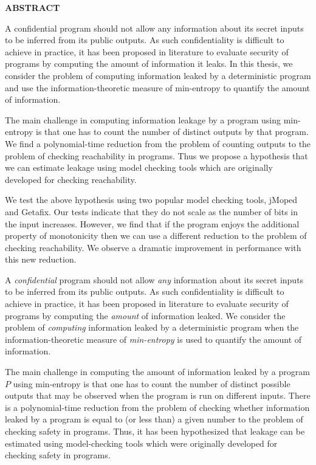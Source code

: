 \newpage
{}

\centerline{\bf \large ABSTRACT}
\vskip 10mm 

A confidential program should not allow any information about its secret inputs to be inferred from its public outputs. As such confidentiality is difficult to achieve in practice, it has been proposed in literature to evaluate security of programs by computing the amount of information it leaks. In this thesis, we consider the problem of computing information leaked by a deterministic program and use the information-theoretic measure of min-entropy to quantify the amount of information.

The main challenge in computing information leakage by a program using min-entropy is that one has to count the number of distinct outputs by that program. We find a polynomial-time reduction from the problem of counting outputs to the problem of checking reachability in programs. Thus we propose a hypothesis that we can estimate leakage using model checking tools which are originally developed for checking reachability.

We test the above hypothesis using two popular model checking tools, jMoped and Getafix. Our tests indicate that they do not scale as the number of bits in the input increases. However, we find that if the program enjoys the additional property of monotonicity then we can use a different reduction to the problem of checking reachability. We observe a dramatic improvement in performance with this new reduction.

\iffalse

A \emph{confidential} program should not allow \emph{any} information about its secret inputs to be inferred from its public outputs.  As such confidentiality is difficult to achieve in practice, it has been proposed in literature to evaluate security of programs by computing the \emph{amount} of information leaked. %
We consider the problem of \emph{computing} 
information leaked by a deterministic  program  when the information-theoretic measure of \emph{min-entropy} is used to quantify the amount of information. 

The main challenge in computing the amount of  information leaked by a program $P$ using min-entropy is that one has to count the number of distinct possible outputs that may be observed when the program is run on different inputs. There is a polynomial-time reduction from the problem of checking whether information leaked by a program is equal to  (or less than) a given number to the problem of checking safety in  programs.  Thus, %
it has been hypothesized that leakage can be estimated using model-checking tools which were  originally developed for checking safety in programs.  
 
